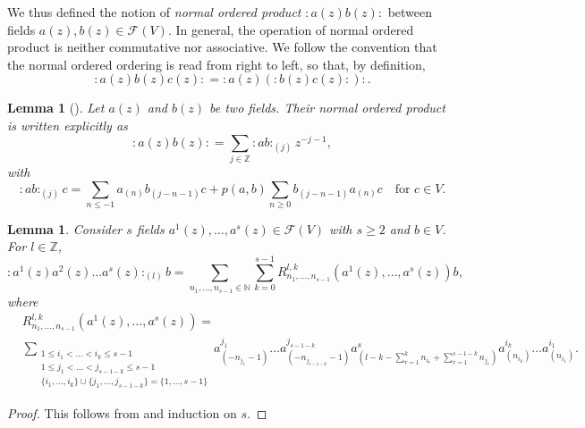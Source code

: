 \documentclass[a4paper, 12pt, reqno]{amsart}
\newtheorem{lemma}[theorem]{Lemma}
\theoremstyle{remark}
\numberwithin{equation}{subsection}
\begin{document}
We thus defined the notion of \emph{normal ordered product} $:a(z)b(z):$ between fields $a(z), b(z) \in \mathcal{F}(V)$.
In general, the operation of normal ordered product is neither commutative nor associative.
We follow the convention that the normal ordered ordering is read from right to left, so that, by definition,
\begin{equation*}
  :a(z)b(z)c(z): = :a(z)(:b(z)c(z):):.
\end{equation*}

\begin{lemma}[{\cite[Proposition 3.3.3]{nozaradan_introduction_2008}}]
  \label{lmm:2}
  Let $a(z)$ and $b(z)$ be two fields.
  Their normal ordered product is written explicitly as
  \begin{equation*}
    :a(z)b(z): = \sum_{j \in \mathbb{Z}}:ab:_{(j)}z^{-j - 1},
  \end{equation*}
  with
  \begin{equation*}
    :ab:_{(j)}c = \sum_{n \le -1}a_{(n)}b_{(j - n - 1)}c + p(a, b)\sum_{n \ge 0}b_{(j - n - 1)}a_{(n)}c \quad \text{for }c \in V.
  \end{equation*}
\end{lemma}

\begin{lemma}
  \label{lmm:3}
  Consider $s$ fields $a^1(z), \dots, a^s(z) \in \mathcal{F}(V)$ with $s \ge 2$ and $b \in V$.
  For $l \in \mathbb{Z}$,
  \begin{equation*}
    :a^1(z)a^2(z)\dots a^s(z):_{(l)}b = \sum_{n_1, \dots, n_{s - 1} \in \mathbb{N}}\sum_{k = 0}^{s - 1}R^{l, k}_{n_1, \dots, n_{s - 1}}(a^1(z), \dots, a^s(z))b,
  \end{equation*}
  where
  \begin{align*}
    &R^{l, k}_{n_1, \dots, n_{s - 1}}(a^1(z), \dots, a^s(z)) = \\
    &\sum_{\substack{1 \le i_1 < \dots < i_k \le s - 1 \\ 1 \le j_1 < \dots < j_{s - 1 - k} \le s - 1 \\ \{i_1, \dots, i_k\} \cup \{j_1, \dots, j_{s - 1 - k}\} = \{1, \dots, s - 1\}}}a^{j_1}_{(-n_{j_1} - 1)}\dots a^{j_{s - 1 - k}}_{(-n_{j_{s - 1 - k}} - 1)}a^s_{(l - k - \sum_{r = 1}^k n_{i_r} + \sum_{r = 1}^{s - 1 - k}n_{j_r})}a^{i_k}_{(n_{i_k})}\dots a^{i_1}_{(n_{i_1})}.
  \end{align*}
\end{lemma}

\begin{proof}
  This follows from  and induction on $s$.
\end{proof}
\end{document}
